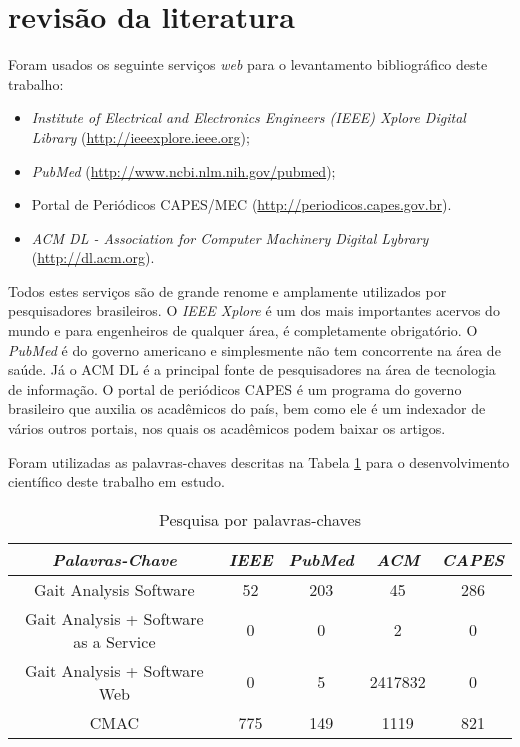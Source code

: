 \section[REVISÃO DA LITERATURA]{revisão da literatura}
Foram usados os seguinte serviços \emph{web} para o levantamento bibliográfico deste trabalho:
\begin{itemize}
	\item \emph{Institute of Electrical and Electronics Engineers (IEEE) Xplore Digital Library} (\url{http://ieeexplore.ieee.org});
	\item \emph{PubMed} (\url{http://www.ncbi.nlm.nih.gov/pubmed});
	\item Portal de Periódicos CAPES/MEC (\url{http://periodicos.capes.gov.br}).
	\item \emph{ACM DL - Association for Computer Machinery Digital Lybrary} (\url{http://dl.acm.org}).
\end{itemize}

Todos estes serviços são de grande renome e amplamente utilizados por pesquisadores brasileiros. 
O \emph{IEEE Xplore} é um dos mais importantes acervos do mundo e para engenheiros de qualquer área, é completamente obrigatório. 
O \emph{PubMed} é do governo americano e simplesmente não tem concorrente na área de saúde. 
Já o ACM DL é a principal fonte de pesquisadores na área de tecnologia de informação. 
O portal de periódicos CAPES é um programa do governo brasileiro que auxilia os acadêmicos do país, bem como ele é um indexador de vários outros portais, nos quais os acadêmicos podem baixar os artigos.

Foram utilizadas as palavras-chaves descritas na Tabela \ref{palavra_chave} para o desenvolvimento científico deste trabalho em estudo. 
\begin{table}[ht]
	\centering
	\caption{Pesquisa por palavras-chaves}
	\label{palavra_chave}
	\ABNTEXfontereduzida
	\begin{tabular}{c c c c c}
		\toprule
		\textit{Palavras-Chave} & \textit{IEEE} & \textit{PubMed} & \textit{ACM} & \textit{CAPES}\\
		\midrule
		\ABNTEXfontereduzida
		Gait Analysis Software  & 52 & 203 & 45 & 286\\
		Gait Analysis + Software as a Service & 0 & 0 & 2 & 0\\
		Gait Analysis + Software Web  & 0 & 5 & 2417832 & 0\\
		CMAC & 775 & 149 & 1119 & 821\\
		\bottomrule
	\end{tabular}
\end{table}

